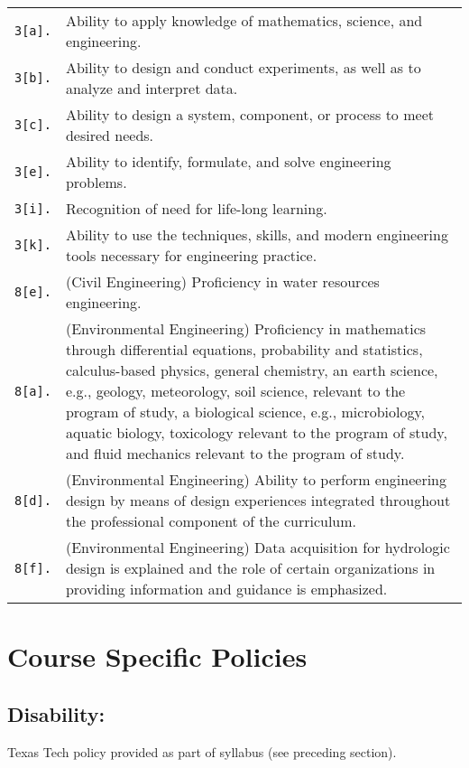\documentclass[12pt]{article}
\begin{document}
\begin{tabular}{p{0.5in}p{5.5in}}
\texttt{3[a].}  & Ability to apply knowledge of mathematics, science, and engineering.\\
\texttt{3[b].}  & Ability to design and conduct experiments, as well as to analyze and interpret data.\\
\texttt{3[c].}  & Ability to design a system, component, or process to meet desired needs.\\
\texttt{3[e].}  & Ability to identify, formulate, and solve engineering problems.\\
\texttt{3[i].}   & Recognition of need for life-long learning.\\
\texttt{3[k].}  & Ability to use the techniques, skills, and modern engineering tools necessary for engineering practice.\\
\texttt{8[e].}  & (Civil Engineering) Proficiency in water resources engineering. \\
\texttt{8[a].} & (Environmental Engineering) Proficiency in mathematics through differential
equations, probability and statistics, calculus-based physics, general chemistry, an earth
science, e.g., geology, meteorology, soil science, relevant to the program of study, a biological
science, e.g., microbiology, aquatic biology, toxicology relevant to the program of study, and
fluid mechanics relevant to the program of study. \\
\texttt{8[d].} & (Environmental Engineering) Ability to perform engineering design by means of
design experiences integrated throughout the professional component of the curriculum. \\
\texttt{8[f].} & (Environmental Engineering) Data acquisition for hydrologic design is explained and
the role of certain organizations in providing information and guidance is emphasized. \\
\end{tabular}



\section*{Course Specific Policies}
\subsection*{Disability:}
Texas Tech policy provided as part of syllabus (see preceding section).
\end{document}
